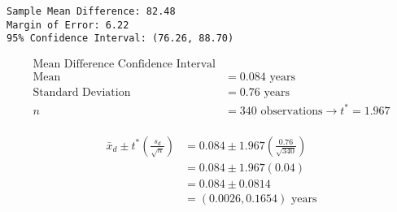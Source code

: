 \documentclass[
  letterpaper,
  DIV=11,
  numbers=noendperiod]{scrartcl}
\begin{document}
\begin{verbatim}
Sample Mean Difference: 82.48
Margin of Error: 6.22
95% Confidence Interval: (76.26, 88.70)
\end{verbatim}

\begin{align*}
\text{Mean Difference Confidence Interval} \\
\text{Mean} &= 0.084 \text{ years} \\
\text{Standard Deviation} &= 0.76 \text{ years} \\
n &= 340 \text{ observations} \rightarrow t^* = 1.967 \\
\end{align*}

\begin{align*}
\bar{x}_d \pm t^* \left( \frac{s_d}{\sqrt{n}} \right) &= 0.084 \pm 1.967 \left( \frac{0.76}{\sqrt{340}} \right) \\
&= 0.084 \pm 1.967 (0.04) \\
&= 0.084 \pm 0.0814 \\
&= (0.0026, 0.1654) \text{ years}
\end{align*}
\end{document}
